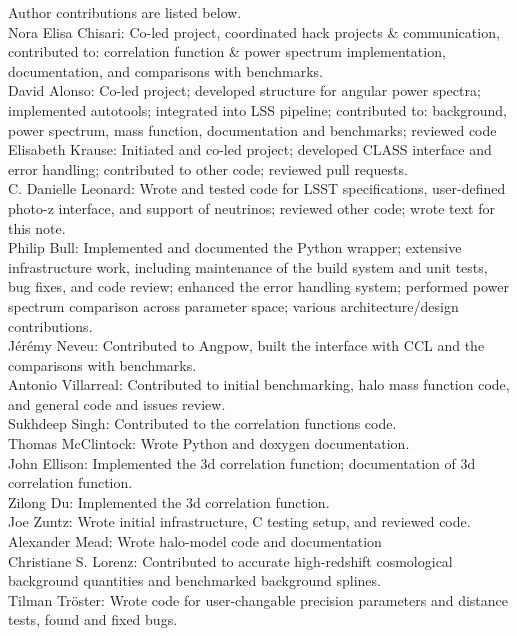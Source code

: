 Author contributions are listed below. \\
Nora Elisa Chisari: Co-led project, coordinated hack projects \& communication, contributed to: correlation function \& power spectrum implementation, documentation, and comparisons with benchmarks. \\
David Alonso: Co-led project; developed structure for angular power spectra; implemented autotools; integrated into LSS pipeline; contributed to: background, power spectrum, mass function, documentation and benchmarks; reviewed code \\
Elisabeth Krause: Initiated and co-led project; developed CLASS interface and error handling; contributed to other code; reviewed pull requests. \\
C. Danielle Leonard: Wrote and tested code for LSST specifications, user-defined photo-z interface, and support of neutrinos; reviewed other code; wrote text for this note. \\
Philip Bull: Implemented and documented the Python wrapper; extensive infrastructure work, including maintenance of the build system and unit tests, bug fixes, and code review; enhanced the error handling system; performed power spectrum comparison across parameter space; various architecture/design contributions. \\
J\'er\'emy Neveu: Contributed to Angpow, built the interface with CCL and the comparisons with benchmarks. \\
Antonio Villarreal: Contributed to initial benchmarking, halo mass function code, and general code and issues review. \\
Sukhdeep Singh: Contributed to the correlation functions code. \\
Thomas McClintock: Wrote Python and doxygen documentation. \\
John Ellison: Implemented the 3d correlation function; documentation of 3d correlation function. \\
Zilong Du: Implemented the 3d correlation function. \\
Joe Zuntz: Wrote initial infrastructure, C testing setup, and reviewed code. \\
Alexander Mead: Wrote halo-model code and documentation \\
Christiane S. Lorenz: Contributed to accurate high-redshift cosmological background quantities and benchmarked background splines. \\
Tilman Tr\"oster: Wrote code for user-changable precision parameters and distance tests, found and fixed bugs. \\
